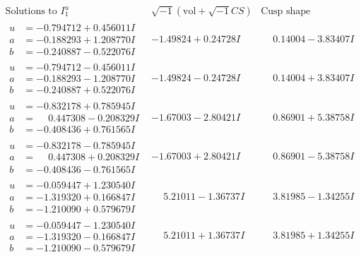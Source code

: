 \documentclass[1p]{elsarticle_modified}
\theoremstyle{definition}
\newcommand{\I}{\sqrt{-1}}
\begin{document}
$$\begin{array}{c|c|c}  
\text{Solutions to }I^u_{1}& \I (\text{vol} + \sqrt{-1}CS) & \text{Cusp shape}\\
 \hline 
\begin{aligned}
u &= -0.794712 + 0.456011 I \\
a &= -0.188293 + 1.208770 I \\
b &= -0.240887 - 0.522076 I\end{aligned}
 & -1.49824 + 0.24728 I & \phantom{-}0.14004 - 3.83407 I \\ \hline\begin{aligned}
u &= -0.794712 - 0.456011 I \\
a &= -0.188293 - 1.208770 I \\
b &= -0.240887 + 0.522076 I\end{aligned}
 & -1.49824 - 0.24728 I & \phantom{-}0.14004 + 3.83407 I \\ \hline\begin{aligned}
u &= -0.832178 + 0.785945 I \\
a &= \phantom{-}0.447308 - 0.208329 I \\
b &= -0.408436 + 0.761565 I\end{aligned}
 & -1.67003 - 2.80421 I & \phantom{-}0.86901 + 5.38758 I \\ \hline\begin{aligned}
u &= -0.832178 - 0.785945 I \\
a &= \phantom{-}0.447308 + 0.208329 I \\
b &= -0.408436 - 0.761565 I\end{aligned}
 & -1.67003 + 2.80421 I & \phantom{-}0.86901 - 5.38758 I \\ \hline\begin{aligned}
u &= -0.059447 + 1.230540 I \\
a &= -1.319320 + 0.166847 I \\
b &= -1.210090 + 0.579679 I\end{aligned}
 & \phantom{-}5.21011 - 1.36737 I & \phantom{-}3.81985 - 1.34255 I \\ \hline\begin{aligned}
u &= -0.059447 - 1.230540 I \\
a &= -1.319320 - 0.166847 I \\
b &= -1.210090 - 0.579679 I\end{aligned}
 & \phantom{-}5.21011 + 1.36737 I & \phantom{-}3.81985 + 1.34255 I \\ \hline\begin{aligned}

\end{aligned}
\end{array}$$
\end{document}
